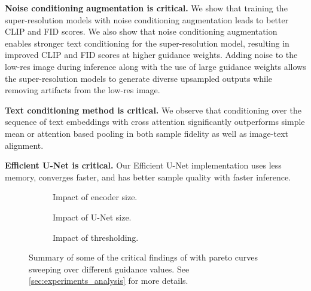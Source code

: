 \textbf{Noise conditioning augmentation is critical.} We show that training the super-resolution models with noise conditioning augmentation leads to better CLIP and FID scores. We also show that noise conditioning augmentation enables stronger text conditioning for the super-resolution model, resulting in improved CLIP and FID scores at higher guidance weights. Adding noise to the low-res image during inference along with the use of large guidance weights allows the super-resolution models to generate diverse upsampled outputs while removing artifacts from the low-res image.

\textbf{Text conditioning method is critical.} We observe that conditioning over the sequence of text embeddings with cross attention significantly outperforms simple mean or attention based pooling in both sample fidelity as well as image-text alignment.

\textbf{Efficient U-Net is critical.} Our Efficient U-Net implementation uses less memory, converges faster, and has better sample quality with faster inference.


\begin{figure}[t]
    \centering
        \begin{subfigure}[t]{0.33\textwidth}
        \centering
        
        \caption{Impact of encoder size.}
        \label{fig:encoder_size_main_paper}
        \end{subfigure}%
        \begin{subfigure}[t]{0.33\textwidth}
        \centering
        
        \caption{Impact of U-Net size.}
        \label{fig:unet_main_paper}
        \end{subfigure}%
        \begin{subfigure}[t]{0.33\textwidth}
        \centering
        
        \caption{Impact of thresholding.}
        \label{fig:clip_vs_scaled_clip_main_paper}
        \end{subfigure}
    \caption{Summary of some of the critical findings of \name with pareto curves sweeping over different guidance values. See \cref{sec:experiments_analysis} for more details.}
    \label{fig:main_ablations}
    \vspace{-1em}
\end{figure}